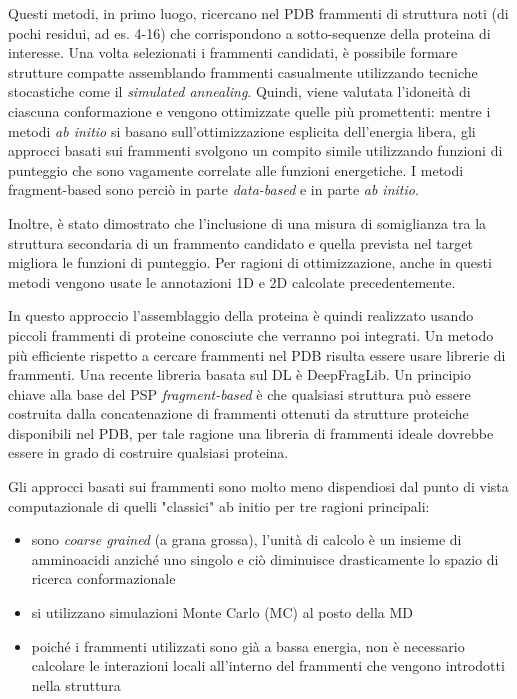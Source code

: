 {Questi metodi, in primo luogo, ricercano nel PDB frammenti di struttura noti (di pochi residui, ad es. 4-16) che corrispondono a sotto-sequenze della proteina di interesse. Una volta selezionati i frammenti candidati, è possibile formare strutture compatte assemblando frammenti casualmente utilizzando tecniche stocastiche come il \textit{simulated annealing}. Quindi, viene valutata l'idoneità di ciascuna conformazione e vengono ottimizzate quelle più promettenti: mentre i metodi \textit{ab initio} si basano sull'ottimizzazione esplicita dell'energia libera, gli approcci basati sui frammenti svolgono un compito simile utilizzando funzioni di punteggio che sono vagamente correlate alle funzioni energetiche\supercite{abbass2020enhancing}. I metodi fragment-based sono perciò in parte \textit{data-based} e in parte \textit{ab initio}.

\par Inoltre, è stato dimostrato che l'inclusione di una misura di somiglianza tra la struttura secondaria di un frammento candidato e quella prevista nel target migliora le funzioni di punteggio. Per ragioni di ottimizzazione, anche in questi metodi vengono usate le annotazioni 1D e 2D calcolate precedentemente.

\par In questo approccio l'assemblaggio della proteina è quindi realizzato usando piccoli frammenti di proteine conosciute che verranno poi integrati. Un metodo più efficiente rispetto a cercare frammenti nel PDB risulta essere usare librerie di frammenti. Una recente libreria basata sul DL è DeepFragLib. Un principio chiave alla base del PSP \textit{fragment-based} è che qualsiasi struttura può essere costruita dalla concatenazione di frammenti ottenuti da strutture proteiche disponibili nel PDB, per tale ragione una libreria di frammenti ideale dovrebbe essere in grado di costruire qualsiasi proteina. \\


\par Gli approcci basati sui frammenti sono molto meno dispendiosi dal punto di vista computazionale di quelli "classici" ab initio per tre ragioni principali\supercite{abbass2020enhancing}: 
\begin{itemize}
	\item sono \textit{coarse grained} (a grana grossa), l'unità di calcolo è un insieme di amminoacidi anziché uno singolo e ciò diminuisce drasticamente lo spazio di ricerca conformazionale
	\item si utilizzano simulazioni Monte Carlo (MC) al posto della MD
	\item poiché i frammenti utilizzati sono già a bassa energia, non è necessario calcolare le interazioni locali all'interno del frammenti che vengono introdotti nella struttura
\end{itemize}

}
